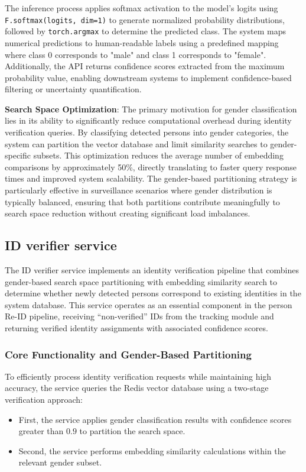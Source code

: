 The inference process applies softmax activation to the model's logits using \texttt{F.softmax(logits, dim=1)} to generate normalized probability distributions, followed by \texttt{torch.argmax} to determine the predicted class. The system maps numerical predictions to human-readable labels using a predefined mapping where class 0 corresponds to "male" and class 1 corresponds to "female". Additionally, the API returns confidence scores extracted from the maximum probability value, enabling downstream systems to implement confidence-based filtering or uncertainty quantification.

\textbf{Search Space Optimization}: The primary motivation for gender classification lies in its ability to significantly reduce computational overhead during identity verification queries. By classifying detected persons into gender categories, the system can partition the vector database and limit similarity searches to gender-specific subsets. This optimization reduces the average number of embedding comparisons by approximately 50\%, directly translating to faster query response times and improved system scalability. The gender-based partitioning strategy is particularly effective in surveillance scenarios where gender distribution is typically balanced, ensuring that both partitions contribute meaningfully to search space reduction without creating significant load imbalances.

\subsection{ID verifier service}
\label{sec:id_verifier_service}
The ID verifier service implements an identity verification pipeline that combines gender-based search space partitioning with embedding similarity search to determine whether newly detected persons correspond to existing identities in the system database. This service operates as an essential component in the person Re-ID pipeline, receiving ``non-verified'' IDs from the tracking module and returning verified identity assignments with associated confidence scores.

\subsubsection{Core Functionality and Gender-Based Partitioning}

To efficiently process identity verification requests while maintaining high accuracy, the service queries the Redis vector database using a two-stage verification approach:
\begin{itemize}
    \item First, the service applies gender classification results with confidence scores greater than $0.9$ to partition the search space.
    \item Second, the service performs embedding similarity calculations within the relevant gender subset.
\end{itemize}

